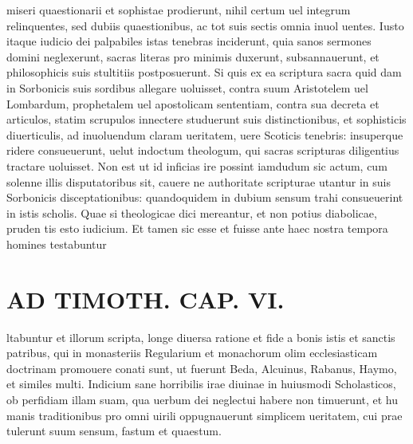 \documentclass{article}
\begin{document}
\begin{pages}
miseri quaestionarii et sophistae prodierunt, nihil certum uel integrum relinquentes, sed dubiis quaestionibus, ac tot suis sectis omnia inuol uentes. Iusto itaque iudicio dei palpabiles istas tenebras inciderunt, quia sanos sermones domini neglexerunt, sacras literas pro minimis duxerunt, subsannauerunt, et philosophicis suis stultitiis postposuerunt. Si quis ex ea scriptura sacra quid dam in Sorbonicis suis sordibus allegare uoluisset, contra suum Aristotelem uel Lombardum, prophetalem uel apostolicam sententiam, contra sua decreta et articulos, statim scrupulos innectere studuerunt suis distinctionibus, et sophisticis diuerticulis, ad inuoluendum claram ueritatem, uere Scoticis tenebris: insuperque  ridere consueuerunt, uelut indoctum theologum, qui sacras scripturas diligentius tractare uoluisset. Non est ut id inficias ire possint iamdudum sic actum, cum solenne illis disputatoribus sit, cauere ne authoritate scripturae utantur in suis Sorbonicis disceptationibus: quandoquidem in dubium sensum trahi consueuerint in istis scholis. Quae si theologicae dici mereantur, et non potius diabolicae, pruden tis esto iudicium. Et tamen sic esse et fuisse ante haec nostra tempora homines testabuntur  \pend
\section*{AD TIMOTH. CAP. VI. }
\marginpar{[ p.531 ]}\pstart ltabuntur et illorum scripta, longe diuersa ratione et fide a bonis istis et sanctis patribus, qui in monasteriis Regularium et monachorum olim ecclesiasticam doctrinam promouere conati sunt, ut fuerunt Beda, Alcuinus, Rabanus, Haymo, et similes multi. Indicium sane horribilis irae diuinae in huiusmodi Scholasticos, ob perfidiam illam suam, qua uerbum dei neglectui habere non timuerunt, et hu manis traditionibus pro omni uirili oppugnauerunt simplicem ueritatem, cui prae tulerunt suum sensum, fastum et quaestum.  \pend
{}
{}

\end{pages}
\end{document}
